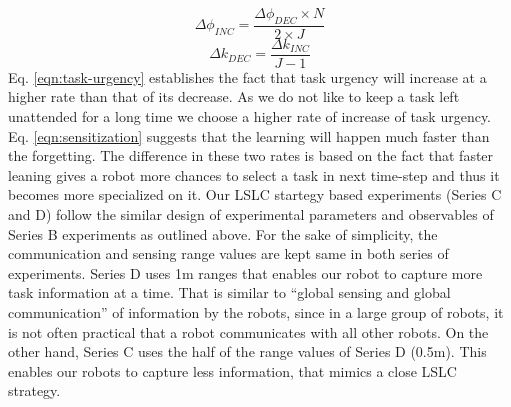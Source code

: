 \documentclass[journal]{IEEEtran}
\begin{document}
\begin{equation}
\Delta\phi_{INC} = \frac{\Delta\phi_{DEC} \times N}{2 \times J}
\label{eqn:task-urgency}
\end{equation}
%
\begin{equation}
\Delta k_{DEC} = \frac{\Delta k_{INC}} {J - 1} 
\label{eqn:sensitization}
\end{equation}
%
Eq. \ref{eqn:task-urgency} establishes the fact that task urgency will increase at a higher rate than that of its decrease. As we do not like to keep a task left unattended for a long time we choose a higher rate of increase of task urgency. Eq. \ref{eqn:sensitization} suggests that the learning will happen much faster than the forgetting. The difference in these two rates is based on the fact that faster leaning gives a robot more chances to select a task in next time-step and thus it becomes more specialized on it.
Our LSLC startegy based experiments (Series C and D) follow the similar design of experimental parameters and observables of Series B experiments as outlined above. For the sake of simplicity, the communication and sensing range values are kept same in both series of experiments. Series D uses 1m ranges that enables our robot to capture more task information at a time. That is similar to  ``global sensing and global communication'' of information by the robots, since in a large group of robots, it is not often practical that a robot communicates with all other robots. On the other hand, Series C uses the half of the range values of Series D (0.5m). This enables our robots to capture less information, that mimics a close LSLC strategy. 
\end{document}
